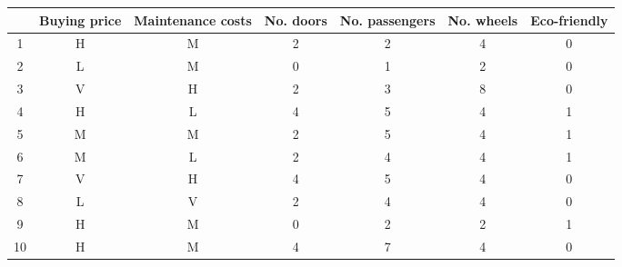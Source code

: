 \begin{tabular}{ccccccc}
\toprule
{} & Buying price & Maintenance costs & No. doors & No. passengers & No. wheels & Eco-friendly \\
\midrule
1  &            H &                 M &         2 &              2 &          4 &            0 \\
2  &            L &                 M &         0 &              1 &          2 &            0 \\
3  &            V &                 H &         2 &              3 &          8 &            0 \\
4  &            H &                 L &         4 &              5 &          4 &            1 \\
5  &            M &                 M &         2 &              5 &          4 &            1 \\
6  &            M &                 L &         2 &              4 &          4 &            1 \\
7  &            V &                 H &         4 &              5 &          4 &            0 \\
8  &            L &                 V &         2 &              4 &          4 &            0 \\
9  &            H &                 M &         0 &              2 &          2 &            1 \\
10 &            H &                 M &         4 &              7 &          4 &            0 \\
\bottomrule
\end{tabular}
